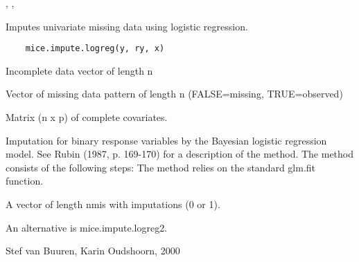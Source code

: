 \documentclass{article}
\begin{document}
\begin{SeeAlso}\relax
{}, , 
\end{SeeAlso}

\begin{Description}\relax
Imputes univariate missing data using logistic regression.
\end{Description}
\begin{Usage}
\begin{verbatim}
    mice.impute.logreg(y, ry, x)
\end{verbatim}
\end{Usage}
\begin{Arguments}
\begin{ldescription}
\item[\code{y}] Incomplete data vector of length n
\item[\code{ry}] Vector of missing data pattern of length n (FALSE=missing,
TRUE=observed) 
\item[\code{x}] Matrix (n x p) of complete covariates.
\end{ldescription}
\end{Arguments}
\begin{Details}\relax
Imputation for binary response variables by the Bayesian 
logistic regression model. See Rubin (1987, p. 169-170) for
a description of the method.
The method consists of the following steps:
The method relies on the standard glm.fit function.
\end{Details}
\begin{Value}
\begin{ldescription}
\item[\code{imp}] A vector of length nmis with imputations (0 or 1).
\end{ldescription}
\end{Value}
\begin{Note}\relax
An alternative is mice.impute.logreg2.
\end{Note}
\begin{Author}\relax
Stef van Buuren, Karin Oudshoorn, 2000
\end{Author}
\end{document}
